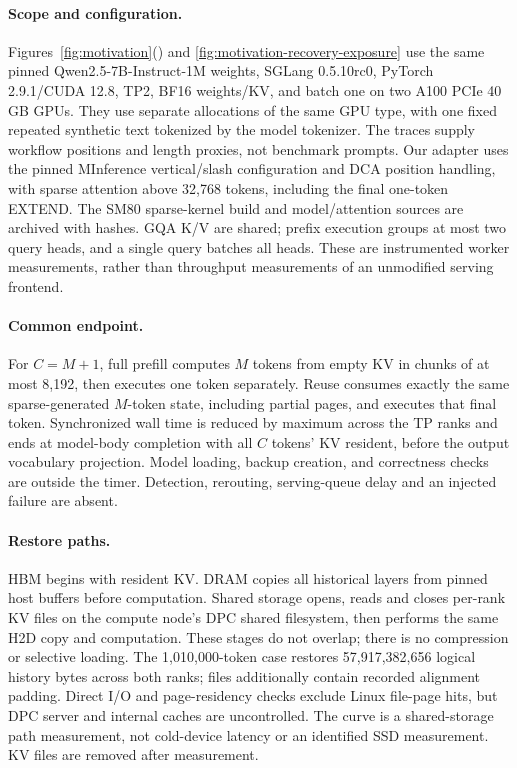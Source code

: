 \documentclass[sigplan,10pt,anonymous,nonacm]{acmart}
\begin{document}
\paragraph{Scope and configuration.}
Figures~\ref{fig:motivation}() and
\ref{fig:motivation-recovery-exposure} use the same pinned
Qwen2.5-7B-Instruct-1M weights, SGLang 0.5.10rc0, PyTorch 2.9.1/CUDA 12.8,
TP2, BF16 weights/KV, and batch one on two A100 PCIe 40\,GB GPUs.
They use separate allocations of the same GPU type, with one fixed
repeated synthetic text tokenized by the model tokenizer. The traces
supply workflow positions and length proxies, not benchmark prompts.
Our adapter uses the pinned MInference vertical/slash configuration and
DCA position handling, with sparse attention above 32,768 tokens,
including the final one-token EXTEND. The SM80 sparse-kernel build and
model/attention sources are archived with hashes. GQA K/V are shared;
prefix execution groups at most two query heads, and a single query
batches all heads. These are instrumented worker measurements, rather
than throughput measurements of an unmodified serving frontend.

\paragraph{Common endpoint.}
For $C=M+1$, full prefill computes $M$ tokens from empty KV in chunks of
at most 8,192, then executes one token separately. Reuse consumes exactly
the same sparse-generated $M$-token state, including partial pages, and
executes that final token. Synchronized wall time is reduced by maximum
across the TP ranks and ends at model-body completion with all $C$ tokens'
KV resident, before the output vocabulary projection. Model loading,
backup creation, and correctness checks are outside the timer. Detection,
rerouting, serving-queue delay and an injected failure are absent.

\paragraph{Restore paths.}
HBM begins with resident KV. DRAM copies all historical layers from
pinned host buffers before computation. Shared storage opens, reads and
closes per-rank KV files on the compute node's DPC shared filesystem,
then performs the same H2D copy and computation. These stages do not
overlap; there is no compression or selective loading. The 1,010,000-token
case restores 57,917,382,656 logical history bytes across both ranks;
files additionally contain recorded alignment padding. Direct I/O and
page-residency checks exclude Linux file-page hits, but DPC server and
internal caches are uncontrolled. The curve is a shared-storage path
measurement, not cold-device latency or an identified SSD measurement.
KV files are removed after measurement.
\end{document}

